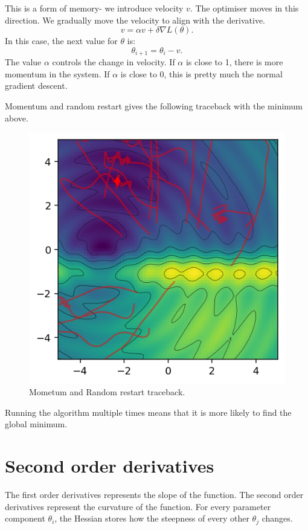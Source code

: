 \documentclass[a4paper, openany]{memoir}
\begin{document}
This is a form of memory- we introduce velocity $v$. The optimiser moves in this direction. We gradually move the velocity to align with the derivative.
\[v = \alpha v + \delta \nabla L(\theta).\]
In this case, the next value for $\theta$ is:
\[\theta_{i+1} = \theta_i - v.\]
The value $\alpha$ controls the change in velocity. If $\alpha$ is close to 1, there is more momentum in the system. If $\alpha$ is close to 0, this is pretty much the normal gradient descent.

Momentum and random restart gives the following traceback with the minimum above.
\begin{figure}[H]
    \centering
    \includegraphics[scale=0.8]{src/4.33 random restart horrible function.png}
    \caption{Mometum and Random restart traceback.}
\end{figure}
\noindent Running the algorithm multiple times means that it is more likely to find the global minimum. 

\newpage

\section{Second order derivatives}
The first order derivatives represents the slope of the function. The second order derivatives represent the curvature of the function. For every parameter component $\theta_i$, the Hessian stores how the steepness of every other $\theta_j$ changes.
\end{document}
